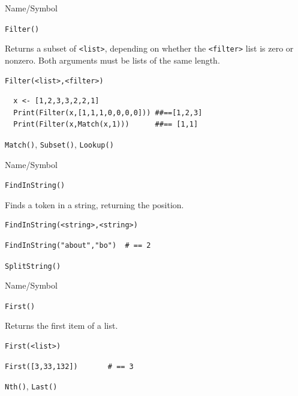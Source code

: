 \begin{desc}{Name/Symbol}
\item[Name/Symbol]	\verb+Filter()+            

\item[Description] Returns a subset of \verb+<list>+, depending on whether the \verb+<filter>+ list is zero or nonzero.  Both arguments must be lists of the same length.

\item[Usage]		
\begin{verbatim}
Filter(<list>,<filter>)
\end{verbatim}

\item[Example]	
\begin{verbatim} 
  x <- [1,2,3,3,2,2,1]
  Print(Filter(x,[1,1,1,0,0,0,0])) ##==[1,2,3]
  Print(Filter(x,Match(x,1)))      ##== [1,1]
\end{verbatim}

\item[See Also]	\verb+Match()+, \verb+Subset()+, \verb+Lookup()+
\end{desc}


\begin{desc}{Name/Symbol}
\item[Name/Symbol]	\verb+FindInString()+

\item[Description]	Finds a token in a string, returning the position.

\item[Usage]
\begin{verbatim}
FindInString(<string>,<string>)
\end{verbatim}

\item[Example]
\begin{verbatim}
FindInString("about","bo") 	# == 2
\end{verbatim}

\item[See Also]	\verb+SplitString()+
\end{desc}



\begin{desc}{Name/Symbol}
\item[Name/Symbol]	\verb+First()+

\item[Description]	Returns the first item of a list.

\item[Usage]
\begin{verbatim}
First(<list>)
\end{verbatim}

\item[Example]
\begin{verbatim}
First([3,33,132])		# == 3
\end{verbatim}

\item[See Also]	\verb+Nth()+, \verb+Last()+
\end{desc}


